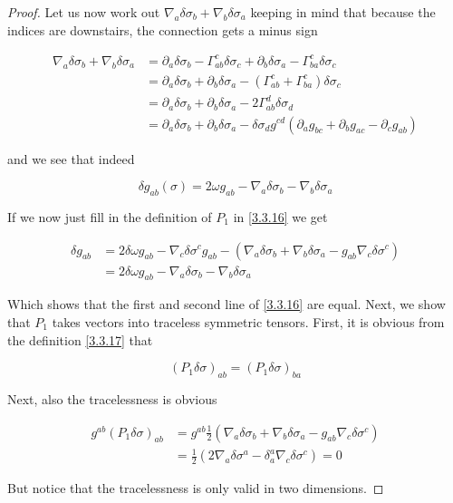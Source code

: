 \begin{tcolorbox}[breakable]
\begin{proof}
		Let us now work out \( \nabla_a \delta \sigma_b + \nabla_b \delta \sigma_a \) keeping in mind that because the indices are downstairs, the connection gets a minus sign
		
		\[
		\begin{aligned}
			\nabla_a \delta \sigma_b + \nabla_b \delta \sigma_a &= \partial_a \delta \sigma_b - \Gamma^c_{ab} \delta \sigma_c + \partial_b \delta \sigma_a - \Gamma^c_{ba} \delta \sigma_c \\
			&= \partial_a \delta \sigma_b + \partial_b \delta \sigma_a - (\Gamma^c_{ab} + \Gamma^c_{ba}) \delta \sigma_c \\
			&= \partial_a \delta \sigma_b + \partial_b \delta \sigma_a - 2 \Gamma^d_{ab} \delta \sigma_d \\
			&= \partial_a \delta \sigma_b + \partial_b \delta \sigma_a - \delta \sigma_d g^{cd} (\partial_a g_{bc} + \partial_b g_{ac} - \partial_c g_{ab})
		\end{aligned}
		\]
		
		and we see that indeed
		
		\[
		\delta g_{ab}(\sigma) = 2 \omega g_{ab} - \nabla_a \delta \sigma_b - \nabla_b \delta \sigma_a
		\]
		
		If we now just fill in the definition of \( P_1 \) in \eqref{3.3.16} we get
		
		\[
		\begin{aligned}
			\delta g_{ab} &= 2 \delta \omega g_{ab} - \nabla_c \delta \sigma^c g_{ab} - (\nabla_a \delta \sigma_b + \nabla_b \delta \sigma_a - g_{ab} \nabla_c \delta \sigma^c) \\
			&= 2 \delta \omega g_{ab} - \nabla_a \delta \sigma_b - \nabla_b \delta \sigma_a
		\end{aligned}
		\]
		
		Which shows that the first and second line of \eqref{3.3.16} are equal.	Next, we show that \( P_1 \) takes vectors into traceless symmetric tensors. First, it is obvious from the definition \eqref{3.3.17} that
		
		\[
		(P_1 \delta \sigma)_{ab} = (P_1 \delta \sigma)_{ba}
		\]
		
		Next, also the tracelessness is obvious
		
		\[
		\begin{aligned}
			g^{ab}(P_1 \delta \sigma)_{ab} &= g^{ab} \frac{1}{2} (\nabla_a \delta \sigma_b + \nabla_b \delta \sigma_a - g_{ab} \nabla_c \delta \sigma^c) \\
			&= \frac{1}{2} (2 \nabla_a \delta \sigma^a - \delta^a_a \nabla_c \delta \sigma^c) = 0
		\end{aligned}
		\]
		
		But notice that the tracelessness is only valid in two dimensions.
	\end{proof}
\end{tcolorbox}
